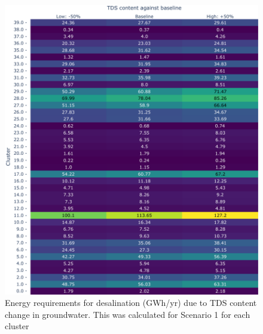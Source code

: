 \documentclass[12pt]{iopart}
\begin{document}
\begin{figure}[!h]
	\centering
	\includegraphics[width=\textwidth]{TDSSensitivityContentCluster}
	\caption{Energy requirements for desalination (GWh/yr) due to TDS content change in groundwater. This was calculated for Scenario 1 for each cluster}
	\label{fig:tdssenscluster}
\end{figure} 
\newpage
\end{document}
